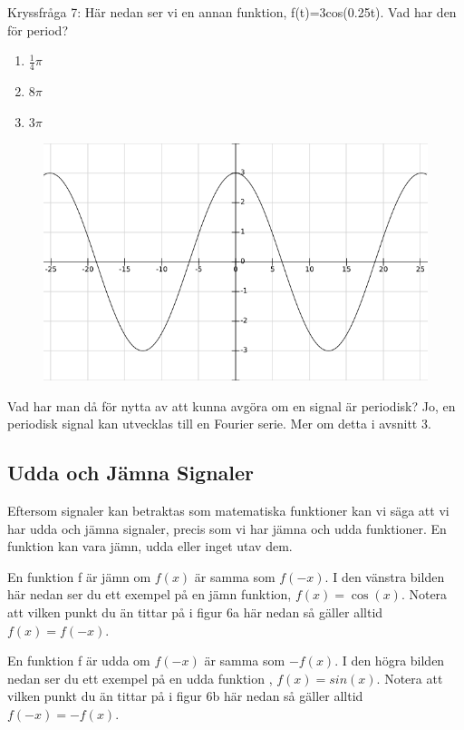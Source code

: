 \documentclass{article}
\begin{document}
\newpage

Kryssfråga 7: Här nedan ser vi en annan funktion, f(t)=3cos(0.25t). Vad har den för period?
\begin{enumerate}[label={\alph*)},font={\bfseries}]
    \item $\frac{1}{4}\pi$
    \item $8\pi$
    \item $3\pi$
\end{enumerate}

\begin{figure}[ht]
\centerline{\includegraphics[scale=0.50]{image11.png}}
\caption{}
\label{}
\end{figure}

Vad har man då för nytta av att kunna avgöra om en signal är periodisk? Jo, en periodisk signal kan utvecklas till en Fourier serie. Mer om detta i avsnitt 3.

\newpage

\subsection{Udda och Jämna Signaler}

Eftersom signaler kan betraktas som matematiska funktioner kan vi säga att vi har udda och jämna signaler, precis som vi har jämna och udda funktioner. En funktion kan vara jämn, udda eller inget utav dem.

En funktion f är jämn om $f(x)$ är samma som $f(-x)$.  I den vänstra bilden här nedan ser du ett exempel på en jämn funktion, $f(x)=\cos(x)$. Notera att vilken punkt du än tittar på i figur 6a här nedan så gäller alltid  $f(x) = f(-x)$.

En funktion f är udda om $f(-x)$ är samma som $-f(x)$. I den högra bilden nedan ser du ett exempel på en udda funktion , $f(x)=sin(x)$. Notera att vilken punkt du än tittar på i figur 6b här nedan så gäller alltid $f(-x) = -f(x)$.
\end{document}
